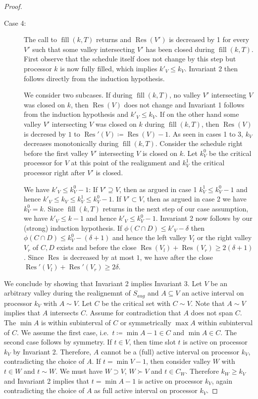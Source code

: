 \documentclass[a4paper]{article}
\DeclareMathOperator{\fillop}{fill}
\DeclareMathOperator{\res}{Res}
\begin{document}
\begin{proof}
\begin{description}
    \item[Case 4:]
      The call to $\fillop(k, T)$ returns and $\res(V')$ is decreased by 1 for every $V'$ such that some valley intersecting $V'$ has been closed during $\fillop(k, T)$.
      First observe that the schedule itself does not change by this step but processor $k$ is now fully filled, which implies $k'_V \leq k_V$.
      Invariant 2 then follows directly from the induction hypothesis.

      We consider two subcases.
      If during $\fillop(k, T)$, no valley $V'$ intersecting $V$ was closed on $k$, then $\res(V)$ does not change and Invariant 1 follows from the induction hypothesis and $k'_V \leq k_V$.
      If on the other hand some valley $V'$ intersecting $V$ was closed on $k$ during $\fillop(k, T)$, then $\res(V)$ is decresed by $1$ to $\res'(V) \coloneqq \res(V) - 1$.
      As seen in cases 1 to 3, $k_V$ decreases monotonically during $\fillop(k, T)$.
      Consider the schedule right before the first valley $V'$ intersecting $V$ is closed on $k$.
      Let $k^0_V$ be the critical processor for $V$ at this point of the realignment and $k^1_V$ the critical processor right after $V'$ is closed.

      We have $k'_V \leq k^0_V - 1$:
      If $V' \supseteq V$, then as argued in case 1 $k^1_V \leq k^0_V - 1$ and hence $k'_V \leq k_V \leq k^1_V \leq k^0_V -1$.
      If $V' \subset V$, then as argued in case 2 we have $k^0_V = k$.
      Since $\fillop(k, T)$ returns in the next step of our case assumption, we have $k'_V \leq k - 1$ and hence $k'_V \leq k^0_V -1$.
      Invariant 2 now follows by our (strong) induction hypothesis.
      If $\phi(C \cap D) \leq k'_V - \delta$ then $\phi(C \cap D) \leq k^0_V - (\delta + 1)$ and hence the left valley $V_l$ or the right valley $V_r$ of $C, D$ exists and before the close $\res(V_l) + \res(V_r) \geq 2 (\delta + 1)$.
      Since $\res$ is decreased by at most $1$, we have after the close $\res'(V_l) + \res'(V_r) \geq 2 \delta$.
  \end{description}

  We conclude by showing that Invariant 2 implies Invariant 3.
  Let $V$ be an arbitrary valley during the realignemnt of $S_{aug}$ and $A \subseteq V$ an active interval on processor $k_V$ with $A \sim V$.
  Let $C$ be the critical set with $C \sim V$.
  Note that $A \sim V$ implies that $A$ intersects $C$.
  Assume for contradiction that $A$ does not span $C$.
  The $\min A$ is within subinterval of $C$ or symmetrically $\max A$ within subinterval of $C$.
  We assume the first case, i.e.\ $t\coloneqq \min A - 1 \in C$ and $\min A \in C$.
  The second case follows by symmetry.
  If $t \in V$, then time slot $t$ is active on processor $k_V$ by Invariant 2.
  Therefore, $A$ cannot be a (full) active interval on processor $k_V$, contradicting the choice of $A$.
  If $t = \min V-1$, then consider valley $W$ with $t \in W$ and $t \sim W$.
  We must have $W \supset V$, $W \succ V$ and $t \in C_W$.
  Therefore $k_W \geq k_V$ and Invariant 2 implies that $t = \min A - 1$ is active on processor $k_V$, again contradicting the choice of $A$ as full active interval on processor $k_V$.
\end{proof}
\end{document}
